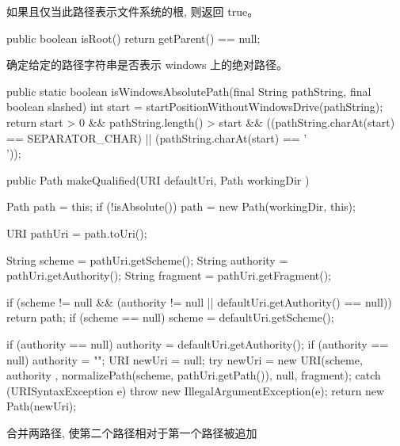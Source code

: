 如果且仅当此路径表示文件系统的根, 则返回 true。
\begin{java}
public boolean isRoot() {
  return getParent() == null;
}
\end{java}
确定给定的路径字符串是否表示 windows 上的绝对路径。
\begin{java}
public static boolean isWindowsAbsolutePath(final String pathString, final boolean slashed) {
  int start = startPositionWithoutWindowsDrive(pathString);
  return start > 0
      && pathString.length() > start
      && ((pathString.charAt(start) == SEPARATOR_CHAR) ||
          (pathString.charAt(start) == '\\'));
}
\end{java}
\begin{java}
public Path makeQualified(URI defaultUri, Path workingDir ) {
  Path path = this;
  if (!isAbsolute()) {
    path = new Path(workingDir, this);
  }

  URI pathUri = path.toUri();

  String scheme = pathUri.getScheme();
  String authority = pathUri.getAuthority();
  String fragment = pathUri.getFragment();

  if (scheme != null &&
      (authority != null || defaultUri.getAuthority() == null))
    return path;
  if (scheme == null) {
    scheme = defaultUri.getScheme();
  }

  if (authority == null) {
    authority = defaultUri.getAuthority();
    if (authority == null) {
      authority = "";
    }
  }
  URI newUri = null;
  try {
    newUri = new URI(scheme, authority ,
      normalizePath(scheme, pathUri.getPath()), null, fragment);
  } catch (URISyntaxException e) {
    throw new IllegalArgumentException(e);
  }
  return new Path(newUri);
}
\end{java}
合并两路径, 使第二个路径相对于第一个路径被追加
